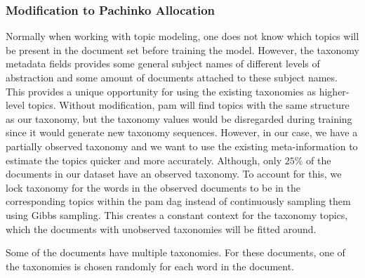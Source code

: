 




\subsubsection{Modification to Pachinko Allocation}\label{subsec:mod_pachinko}
Normally when working with topic modeling, one does not know which topics will be present in the document set before training the model.
However, the taxonomy metadata fields provides some general subject names of different levels of abstraction and some amount of documents attached to these subject names.
This provides a unique opportunity for using the existing taxonomies as higher-level topics.
Without modification, \gls{pam} will find topics with the same structure as our taxonomy, but the taxonomy values would be disregarded during training since it would generate new taxonomy sequences.
However, in our case, we have a partially observed taxonomy and we want to use the existing meta-information to estimate the topics quicker and more accurately.
Although, only $25\%$ of the documents in our dataset have an observed taxonomy.
To account for this, we lock taxonomy for the words in the observed documents to be in the corresponding topics within the \gls{pam} \gls{dag} instead of continuously sampling them using Gibbs sampling.
This creates a constant context for the taxonomy topics, which the documents with unobserved taxonomies will be fitted around.

Some of the documents have multiple taxonomies.
For these documents, one of the taxonomies is chosen randomly for each word in the document. 

